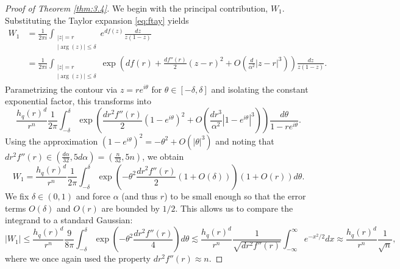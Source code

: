 \documentclass[a4paper,twoside, reqno]{amsart}
\numberwithin{equation}{section}
\theoremstyle{definition}%
\theoremstyle{definition}
\theoremstyle{definition}%
\theoremstyle{definition}
\begin{document}
\begin{proof}[Proof of Theorem \ref{thm:3.4}]
We begin with the principal contribution, $W_1$. Substituting the Taylor expansion \eqref{eq:ftay} yields
\begin{align*}
    W_1 &= \frac{1}{2 \pi i} \int_{\substack{|z|=r \\ |\arg(z)| \leq \delta}} e^{d f(z)} \frac{dz}{z(1-z)} \\
        &= \frac{1}{2 \pi i} \int_{\substack{|z|=r \\ |\arg(z)| \leq \delta}} \exp\left(d f(r) + \frac{df''(r)}{2}(z-r)^2 + O\left(\frac{d}{\alpha^2} |z-r|^3\right)\right) \frac{dz}{z(1-z)}.
\end{align*}
Parametrizing the contour via $z = re^{i\theta}$ for $\theta \in [-\delta, \delta]$ and isolating the constant exponential factor, this transforms into
\[
    \frac{h_q(r)^d}{r^n} \frac{1}{2 \pi} \int_{-\delta}^{\delta} \exp\left( \frac{dr^2f''(r)}{2}(1-e^{i\theta})^2 + O\left(\frac{d r^3}{\alpha^2} |1-e^{i\theta}|^3\right) \right) \frac{d\theta}{1-re^{i\theta}}.
\]
Using the approximation $(1-e^{i\theta})^2 = -\theta^2 + O(|\theta|^3)$ and noting that $d r^2 f''(r)  \in (\frac{d\alpha}{32}, 5d\alpha) = (\frac{n}{32}, 5n)$, we obtain
\[
    W_1 = \frac{h_q(r)^d}{r^n} \frac{1}{2 \pi} \int_{-\delta}^{\delta} \exp\left( -\theta^2 \frac{d r^2 f''(r) }{2} (1 + O(\delta)) \right) (1 + O(r)) d\theta.
\]
We fix $\delta \in (0,1)$ and force $\alpha$ (and thus $r$) to be small enough so that the error terms $O(\delta)$ and $O(r)$ are bounded by $1/2$. 
This allows us to compare the integrand to a standard Gaussian:
\[
    |W_1| \leq \frac{h_q(r)^d}{r^n} \frac{9}{8 \pi} \int_{-\delta}^{\delta} \exp\left( -\theta^2 \frac{dr^2f''(r)}{4} \right) d\theta 
    \lesssim \frac{h_q(r)^d}{r^n} \frac{1}{\sqrt{d r^2 f''(r) }} \int_{-\infty}^{\infty} e^{-x^2/2} dx 
    \approx \frac{h_q(r)^d}{r^n} \frac{1}{\sqrt{n}},
\]
where we once again used the property $d r^2 f''(r) \approx n$.


\end{proof}
\end{document}
